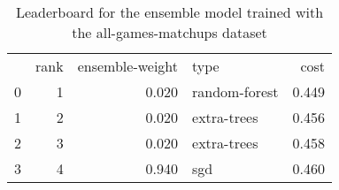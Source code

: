 \begin{table}[]
	\centering
	\begin{tabular}{lrrlr}
		  & rank & ensemble-weight & type          & cost  \\
		0 & 1    & 0.020           & random-forest & 0.449 \\
		1 & 2    & 0.020           & extra-trees   & 0.456 \\
		2 & 3    & 0.020           & extra-trees   & 0.458 \\
		3 & 4    & 0.940           & sgd           & 0.460 \\
	\end{tabular}

	\caption{Leaderboard for the ensemble model trained with the all-games-matchups dataset}
	\label{tab:lb-all-games-matchups-randsplit}
\end{table}

